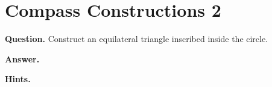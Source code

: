 \documentclass{article}
\begin{document}
\section*{Compass Constructions 2}
\textbf{Question.} Construct an equilateral triangle inscribed inside the circle.

\textbf{Answer.} 

\textbf{Hints.}
\begin{itemize}

\end{itemize}
\end{document}
